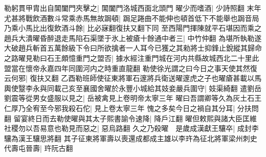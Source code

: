勒躬貫甲胄出自閶闔門夾擊之|{
	閶闔門洛城西面北頭門}
曜少而嗜酒|{
	少詩照翻}
末年尤甚將戰飲酒數斗常乘赤馬無故跼頓|{
	跼足踡曲不能伸也頓首低下不能舉也跼音局}
乃乘小馬比出復飲酒斗餘|{
	比必寐翻復扶又翻下同}
至西陽門揮陳就平石堪因而乘之趙兵大潰曜昏醉退走馬陷石渠墜于氷上被瘡十餘通中者三|{
	中竹仲翻}
為堪所執勒遂大破趙兵斬首五萬餘級下令曰所欲擒者一人耳今已獲之其勑將士抑鋒止銳縱其歸命之路曜見勒曰石王頗憶重門之盟否|{
	據水經注重門城在河内共縣故城西北二十里此盟當在懷帝永嘉四年同圍河内之時重直龍翻}
勒使徐光謂之曰今日之事天使其然復云何邪|{
	復扶又翻}
乙酉勒班師使征東將軍石邃將兵衛送曜邃虎之子也曜瘡甚載以馬輿使毉李永與同載己亥至襄國舍曜於永豐小城給其妓妾嚴兵圍守|{
	妓渠綺翻}
遣劉岳劉震等從男女盛服以見之|{
	岳被禽見上卷明帝太寧三年}
曜曰吾謂卿等久為灰土石王仁厚乃全宥至今邪我殺石佗|{
	見上卷太寧三年}
愧之多矣今日之禍自其分耳|{
	分扶問翻}
留宴終日而去勒使曜與其太子熙書諭令速降|{
	降戶江翻}
曜但敕熙與諸大臣匡維社稷勿以吾易意也勒見而惡之|{
	惡烏路翻}
久之乃殺曜　是歲成漢獻王驤卒|{
	成封李驤為漢王驤思將翻}
其子征東將軍壽以喪還成都成主雄以李玝為征北將軍梁州刺史代壽屯晉壽|{
	玝阮古翻}



